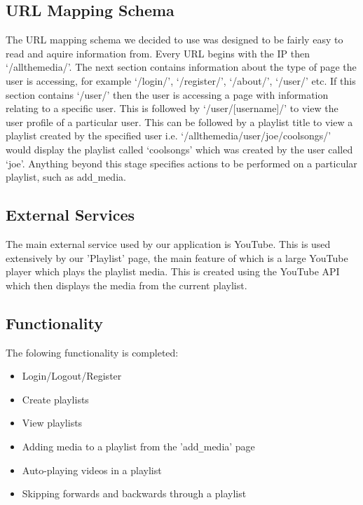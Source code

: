 \documentclass{sig-alt-release2}
\begin{document}
\subsection{URL Mapping Schema}

The URL mapping schema we decided to use was designed to be fairly easy to read and aquire information from. Every URL begins with the IP then `/allthemedia/'. The next section contains information about the type of page the user is accessing, for example `/login/', `/register/', `/about/', `/user/' etc. If this section contains `/user/' then the user is accessing a page with information relating to a specific user. This is followed by `/user/[username]/' to view the user profile of a particular user. This can be followed by a playlist title to view a playlist created by the specified user i.e. `/allthemedia/user/joe/coolsongs/' would display the playlist called `coolsongs' which was created by the user called `joe'. Anything beyond this stage specifies actions to be performed on a particular playlist, such as add\verb=_=media.

\subsection{External Services}

The main external service used by our application is YouTube. This is used extensively by our 'Playlist' page, the main feature of which is a large YouTube player which plays the playlist media. This is created using the YouTube API which then displays the media from the current playlist.

\subsection{Functionality}

The folowing functionality is completed:

\begin{itemize}
\item Login/Logout/Register
\item Create playlists
\item View playlists
\item Adding media to a playlist from the 'add\verb=_=media' page
\item Auto-playing videos in a playlist
\item Skipping forwards and backwards through a playlist
\end{itemize}
\end{document}
